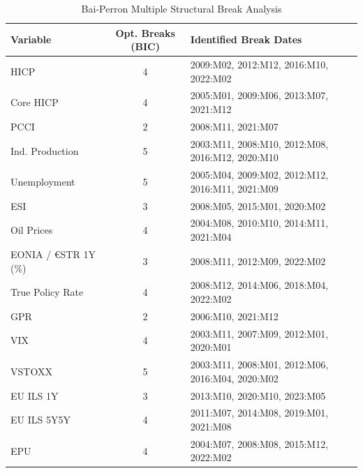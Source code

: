 \begin{table}[ht]
\centering
\begin{tabular}{lcl}
  \hline
Variable & Opt. Breaks (BIC) & Identified Break Dates \\ 
  \hline
HICP &   4 & 2009:M02, 2012:M12, 2016:M10, 2022:M02 \\ 
  Core HICP &   4 & 2005:M01, 2009:M06, 2013:M07, 2021:M12 \\ 
  PCCI &   2 & 2008:M11, 2021:M07 \\ 
  Ind. Production &   5 & 2003:M11, 2008:M10, 2012:M08, 2016:M12, 2020:M10 \\ 
  Unemployment &   5 & 2005:M04, 2009:M02, 2012:M12, 2016:M11, 2021:M09 \\ 
  ESI &   3 & 2008:M05, 2015:M01, 2020:M02 \\ 
  Oil Prices &   4 & 2004:M08, 2010:M10, 2014:M11, 2021:M04 \\ 
  EONIA / €STR 1Y (\%) &   3 & 2008:M11, 2012:M09, 2022:M02 \\ 
  True Policy Rate &   4 & 2008:M12, 2014:M06, 2018:M04, 2022:M02 \\ 
  GPR &   2 & 2006:M10, 2021:M12 \\ 
  VIX &   4 & 2003:M11, 2007:M09, 2012:M01, 2020:M01 \\ 
  VSTOXX &   5 & 2003:M11, 2008:M01, 2012:M06, 2016:M04, 2020:M02 \\ 
  EU ILS 1Y &   3 & 2013:M10, 2020:M10, 2023:M05 \\ 
  EU ILS 5Y5Y &   4 & 2011:M07, 2014:M08, 2019:M01, 2021:M08 \\ 
  EPU &   4 & 2004:M07, 2008:M08, 2015:M12, 2022:M02 \\ 
   \hline
\end{tabular}
\caption{Bai-Perron Multiple Structural Break Analysis} 
\label{tab:bai_perron}
\end{table}
